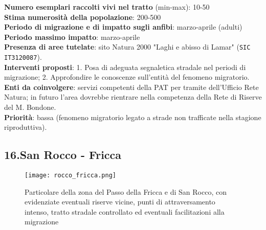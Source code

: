 \documentclass[11pt,a4paper,twoside]{memoir}
\begin{document}
\textbf{Numero esemplari raccolti vivi nel tratto} (min-max): 10-50 \\
\textbf{Stima numerosità della popolazione}: 200-500 \\
\textbf{Periodo di migrazione e di impatto sugli anfibi}: marzo-aprile (adulti) \\
\textbf{Periodo massimo impatto}: marzo-aprile \\
\textbf{Presenza di aree tutelate}: sito Natura 2000 "Laghi e abisso di Lamar" (\texttt{SIC IT3120087}). \\
\textbf{Interventi proposti}: 1. Posa di adeguata segnaletica stradale nel periodi di migrazione; 2. Approfondire le conoscenze sull’entità del fenomeno migratorio.
\textbf{Enti da coinvolgere}: servizi competenti della PAT per tramite dell’Ufficio Rete Natura; in futuro l’area dovrebbe rientrare nella competenza della Rete di Riserve del M. Bondone. \\
\textbf{Priorità}: bassa (fenomeno migratorio legato a strade non trafficate nella stagione riproduttiva). \\

\newpage
\begin{tcolorbox}[breakable,colback=white,colframe=red,width=10cm]
\subsection{16.San Rocco - Fricca}
\end{tcolorbox}

\begin{figure}[H]
\label{fig:map_rocco_fricca}
\centering
  \texttt{[image: rocco\_fricca.png]}
\caption{Particolare della zona del Passo della Fricca e di San Rocco, con evidenziate eventuali riserve vicine, punti di attraversamento intenso, tratto stradale controllato ed eventuali facilitazioni alla migrazione}
\end{figure}
\end{document}

